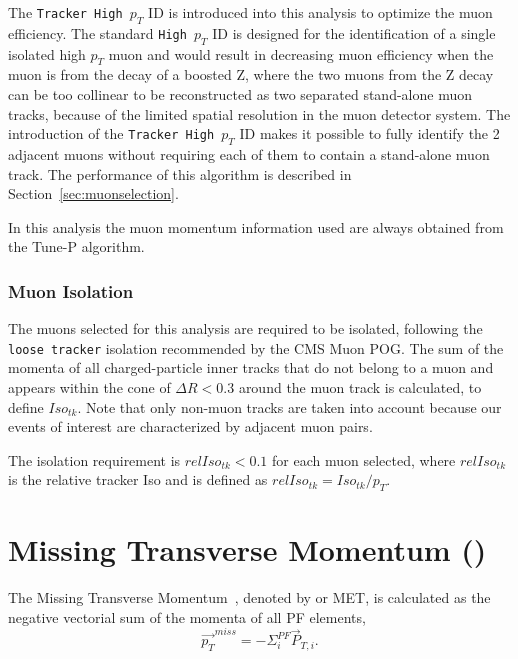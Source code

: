 The \texttt{Tracker High $p_T$} ID is introduced into this analysis to optimize the muon efficiency. The standard \texttt{High $p_T$} ID is designed for the identification of a single isolated high $p_T$ muon and would result in decreasing muon efficiency when the muon is from the decay of a boosted Z, where the two muons from the Z decay can be too collinear to be reconstructed as two separated stand-alone muon tracks, because of the limited spatial resolution in the muon detector system. The introduction of the \texttt{Tracker High $p_T$} ID makes it possible to fully identify the 2 adjacent muons without requiring each of them to contain a stand-alone muon track. The performance of this algorithm is described in Section~\ref{sec:muonselection}.

\vspace{0.3cm}
In this analysis the muon momentum information used are always obtained from the Tune-P algorithm.

\subsubsection{Muon Isolation}
The muons selected for this analysis are required to be isolated, following the \texttt{loose tracker} isolation recommended by the CMS Muon POG. The sum of the momenta of all charged-particle inner tracks that do not belong to a muon and appears within the cone of $\Delta R<0.3$ around the muon track is calculated, to define $Iso_{tk}$. Note that only non-muon tracks are taken into account because our events of interest are characterized by adjacent muon pairs.

\vspace{0.3cm}
The isolation requirement is $relIso_{tk}<0.1$ for each muon selected, where $relIso_{tk}$ is the relative tracker Iso and is defined as $relIso_{tk}=Iso_{tk}/p_{T}$.

\section{Missing Transverse Momentum (\boldmath{\ptmiss})}
The Missing Transverse Momentum~\cite{ob_metconst}, denoted by \ptmiss or MET, is calculated as the negative vectorial sum of the momenta of all PF elements,
\begin{equation}
\vec{p_T} ^{miss} = -\Sigma_{i}^{PF} \vec{P}_{T,i}.
\label{eqn:ob_metdef}
\end{equation}

